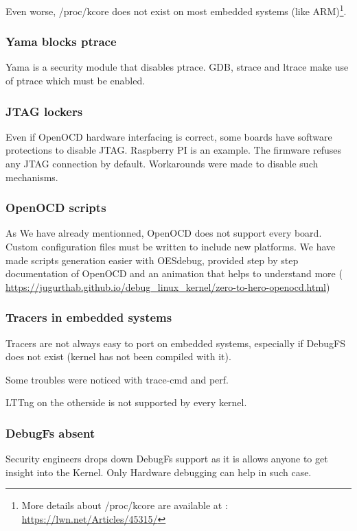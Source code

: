 Even worse, /proc/kcore does not exist on most embedded systems (like ARM)\footnote{More details about /proc/kcore are available at :  {\color{blue}\url{https://lwn.net/Articles/45315/}}}.


\subsubsection{Yama blocks ptrace}
Yama is a security module that disables ptrace. GDB, strace and ltrace make use of ptrace which must be enabled.
\subsubsection{JTAG lockers}
Even if OpenOCD hardware interfacing is correct, some boards have software protections to disable JTAG. Raspberry PI is an example. The firmware refuses any JTAG connection by default. Workarounds were made to disable such mechanisms.


\subsubsection{OpenOCD scripts}
As We have already mentionned, OpenOCD does not support every board. Custom configuration files must be written to include new platforms. We have made scripts generation easier with OESdebug, provided step by step documentation of OpenOCD and an animation that helps to understand more ({\color{blue} \url{https://jugurthab.github.io/debug_linux_kernel/zero-to-hero-openocd.html}}) 

\subsubsection{Tracers in embedded systems}
Tracers are not always easy to port on embedded systems, especially if DebugFS does not exist (kernel has not been compiled with it).

Some troubles were noticed with trace-cmd and perf.

LTTng on the otherside is not supported by every kernel.

\subsubsection{DebugFs absent}
Security engineers drops down DebugFs support as it is allows anyone to get insight into the Kernel. Only Hardware debugging can help in such case. 
